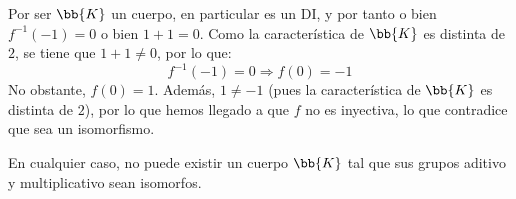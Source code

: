 \begin{ejercicio}
\begin{enumerate}
        Por ser $\bb{K}$ un cuerpo, en particular es un DI, y por tanto o bien $f^{-1}(-1)=0$ o bien $1+1=0$. Como la característica de $\bb{K}$ es distinta de $2$, se tiene que $1+1\neq 0$, por lo que:
        \begin{equation*}
            f^{-1}(-1)=0\Longrightarrow f(0)=-1
        \end{equation*}
        No obstante, $f(0)=1$. Además, $1\neq -1$ (pues la característica de $\bb{K}$ es distinta de $2$), por lo que hemos llegado a que $f$ no es inyectiva, lo que contradice que sea un isomorfismo.
    \end{enumerate}

    En cualquier caso, no puede existir un cuerpo $\bb{K}$ tal que sus grupos aditivo y multiplicativo sean isomorfos.    
\end{ejercicio}